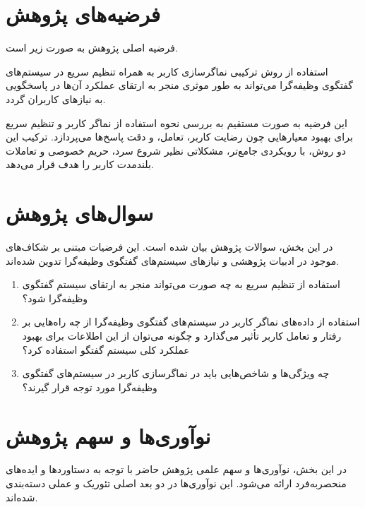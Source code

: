 \section{فرضیه‌های پژوهش}


فرضیه اصلی پژوهش به صورت زیر است.

استفاده از روش ترکیبی نماگر‌سازی کاربر به همراه تنظیم سریع در سیستم‌های گفتگوی وظیفه‌گرا می‌تواند به طور موثری منجر به ارتقای عملکرد آن‌ها در پاسخگویی به نیازهای کاربران گردد.

این فرضیه به صورت مستقیم به بررسی نحوه استفاده از نماگر کاربر و تنظیم سریع برای بهبود معیارهایی چون رضایت کاربر، تعامل، و دقت پاسخ‌ها می‌پردازد. ترکیب این دو روش، با رویکردی جامع‌تر، مشکلاتی نظیر شروع سرد، حریم خصوصی و تعاملات بلندمدت کاربر را هدف قرار می‌دهد.


\section{سوال‌های پژوهش}

در این بخش، سوالات پژوهش بیان شده است. این فرضیات مبتنی بر شکاف‌های موجود در ادبیات پژوهشی و نیازهای سیستم‌های گفتگوی وظیفه‌گرا تدوین شده‌اند.

\begin{enumerate}
\item
استفاده از تنظیم سریع به چه صورت می‌تواند منجر به ارتقای سیستم گفتگوی وظیفه‌گرا شود؟

\item
استفاده از داده‌های نماگر کاربر در سیستم‌های گفتگوی وظیفه‌گرا از چه راه‌هایی بر رفتار و تعامل کاربر تأثیر می‌گذارد و چگونه می‌توان از این اطلاعات برای بهبود عملکرد کلی سیستم گفتگو استفاده کرد؟

\item
چه ویژگی‌ها و شاخص‌هایی باید در نماگر‌سازی کاربر در سیستم‌های گفتگوی وظیفه‌گرا مورد توجه قرار گیرند؟
\end{enumerate}

\section{نوآوری‌ها و سهم پژوهش}

در این بخش، نوآوری‌ها و سهم علمی پژوهش حاضر با توجه به دستاوردها و ایده‌های منحصربه‌فرد ارائه می‌شود. این نوآوری‌ها در دو بعد اصلی تئوریک و عملی دسته‌بندی شده‌اند.


